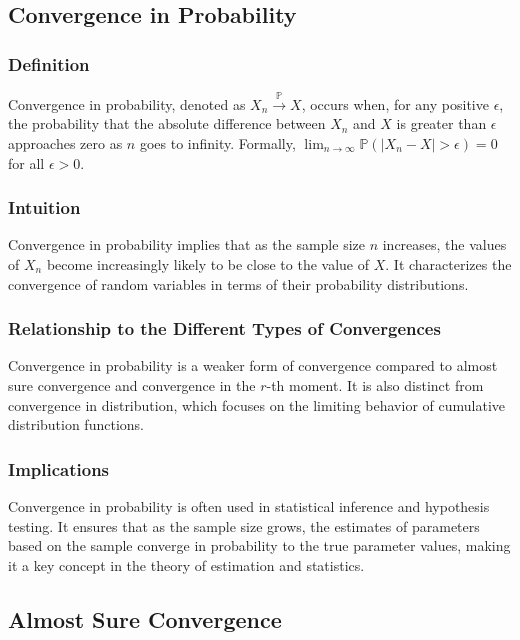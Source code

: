 \documentclass{article}
\begin{document}
\subsection{Convergence in Probability}

\subsubsection{Definition}
Convergence in probability, denoted as \(X_n \xrightarrow{\mathbb{P}} X\), occurs when, for any positive \(\epsilon\), the probability that the absolute difference between \(X_n\) and \(X\) is greater than \(\epsilon\) approaches zero as \(n\) goes to infinity. Formally, \(\lim_{n \to \infty} \mathbb{P}(|X_n - X| > \epsilon) = 0\) for all \(\epsilon > 0\).

\subsubsection{Intuition}
Convergence in probability implies that as the sample size \(n\) increases, the values of \(X_n\) become increasingly likely to be close to the value of \(X\). It characterizes the convergence of random variables in terms of their probability distributions.

\subsubsection{Relationship to the Different Types of Convergences}
Convergence in probability is a weaker form of convergence compared to almost sure convergence and convergence in the \(r\)-th moment. It is also distinct from convergence in distribution, which focuses on the limiting behavior of cumulative distribution functions.

\subsubsection{Implications}
Convergence in probability is often used in statistical inference and hypothesis testing. It ensures that as the sample size grows, the estimates of parameters based on the sample converge in probability to the true parameter values, making it a key concept in the theory of estimation and statistics.

\subsection{Almost Sure Convergence}
\end{document}
